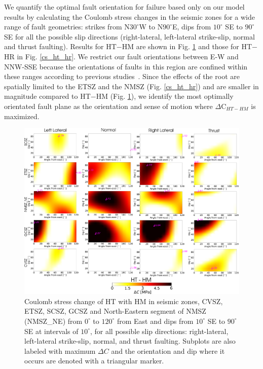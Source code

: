 \documentclass[draft,linenumbers]{agujournal2018}
\begin{document}
     We quantify the optimal fault orientation for failure based only on our model results by calculating the Coulomb stress changes in the seismic zones for a wide range of fault geometries: strikes from N$30^\circ$W to N$90^\circ$E, dips from $10^\circ$ SE to $90^\circ$ SE %
     for all the possible slip directions (right-lateral, left-lateral strike-slip, normal and thrust faulting). Results for HT$-$HM are shown in Fig. \ref{cs_ht_hm} and those for HT$-$HR in Fig. \ref{cs_ht_hr}. We restrict our fault orientations between E-W and NNW-SSE because the orientations of faults in this region are confined within these ranges according to previous studies~\citep{shumway2008focal, hurd2012intraplate, johnson2014earthquake, cooley2015new}. Since the effects of the root are spatially limited to the ETSZ and the NMSZ (Fig. \ref{cs_ht_hr}) and are smaller in magnitude compared to HT$-$HM (Fig. \ref{cs_ht_hm}), we identify the most optimally orientated fault plane as the orientation and sense of motion where $\Delta$C$_{HT-HM}$ is maximized.
\begin{figure}[ht]
    \centering
    \includegraphics[width=\linewidth]{figures/ht_hm_summ.png}
    \caption{Coulomb stress change of HT with HM in seismic zones, CVSZ, ETSZ, SCSZ, GCSZ and North-Eastern segment of NMSZ (NMSZ\_NE) from $0^\circ$ to $120^\circ$ from East and dips from $10^\circ$ SE to $90^\circ$ SE at intervals of $10^\circ$, for all possible slip directions: right-lateral, left-lateral strike-slip, normal, and thrust faulting. Subplots are also labeled with maximum $\Delta C$ and the orientation and dip where it occurs are denoted with a triangular marker.}
    \label{cs_ht_hm}
\end{figure}
\end{document}
